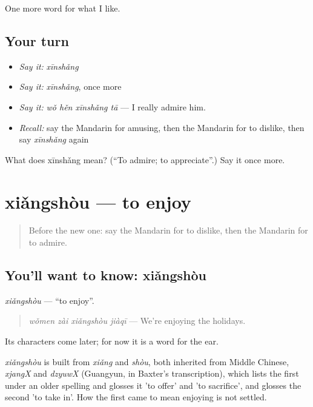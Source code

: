 \begin{grammarlens}[title={What you've built}]
One more word for what I like.
\end{grammarlens}

\subsection*{Your turn}
\begin{itemize}
\raggedright
  \item \emph{Say it:} \emph{xīnshǎng}
  \item \emph{Say it:} \emph{xīnshǎng}, once more
  \item \emph{Say it:} \emph{wǒ hěn xīnshǎng tā} — I really admire him.
  \item \emph{Recall:} say the Mandarin for amusing, then the Mandarin for to dislike, then say \emph{xīnshǎng} again
\end{itemize}

\begin{tcolorbox}[breakable,colback=teal!4,colframe=teal!35!black,title={Before you move on}]
What does xīnshǎng mean? (\textquotedblleft{}To admire; to appreciate\textquotedblright{}.) Say it once more.
\end{tcolorbox}
\section[xiǎngshòu]{xiǎngshòu — to enjoy}

\label{lesson:ZH-C277-xiangshou}



\begin{quote}
Before the new one: say the Mandarin for to dislike, then the Mandarin for to admire.
\end{quote}

\subsection*{You'll want to know: xiǎngshòu}
\emph{xiǎngshòu} — \textquotedblleft{}to enjoy\textquotedblright{}.

\begin{quote}
\emph{wǒmen zài xiǎngshòu jiàqī} — We're enjoying the holidays.
\end{quote}

Its characters come later; for now it is a word for the ear.

\begin{cousinweb}
\emph{xiǎngshòu} is built from \emph{xiǎng} and \emph{shòu}, both inherited from Middle Chinese, \emph{xjangX} and \emph{dzyuwX} (Guangyun, in Baxter's transcription), which lists the first under an older spelling and glosses it 'to offer' and 'to sacrifice', and glosses the second 'to take in'. How the first came to mean enjoying is not settled.
\end{cousinweb}

